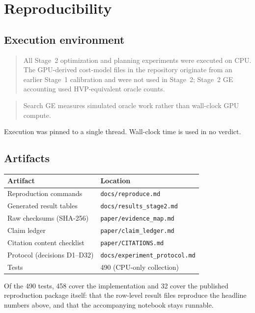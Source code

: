 \section{Reproducibility}
\label{sec:reproducibility}

\subsection{Execution environment}

\begin{quote}
All Stage~2 optimization and planning experiments were executed on CPU. The
GPU-derived cost-model files in the repository originate from an earlier Stage~1
calibration and were not used in Stage~2; Stage~2 GE accounting used HVP-equivalent
oracle counts.
\end{quote}

\begin{quote}
Search GE measures simulated oracle work rather than wall-clock GPU compute.
\end{quote}

Execution was pinned to a single thread. Wall-clock time is used in no verdict.

\subsection{Artifacts}

\begin{center}
\begin{tabular}{ll}
\toprule
Artifact & Location \\
\midrule
Reproduction commands       & \texttt{docs/reproduce.md} \\
Generated result tables     & \texttt{docs/results\_stage2.md} \\
Raw checksums (SHA-256)     & \texttt{paper/evidence\_map.md} \\
Claim ledger                & \texttt{paper/claim\_ledger.md} \\
Citation content checklist  & \texttt{paper/CITATIONS.md} \\
Protocol (decisions D1--D32) & \texttt{docs/experiment\_protocol.md} \\
Tests                       & 490 (CPU-only collection) \\
\bottomrule
\end{tabular}
\end{center}

Of the 490 tests, 458 cover the implementation and 32 cover the published reproduction
package itself: that the row-level result files reproduce the headline numbers above, and
that the accompanying notebook stays runnable.

